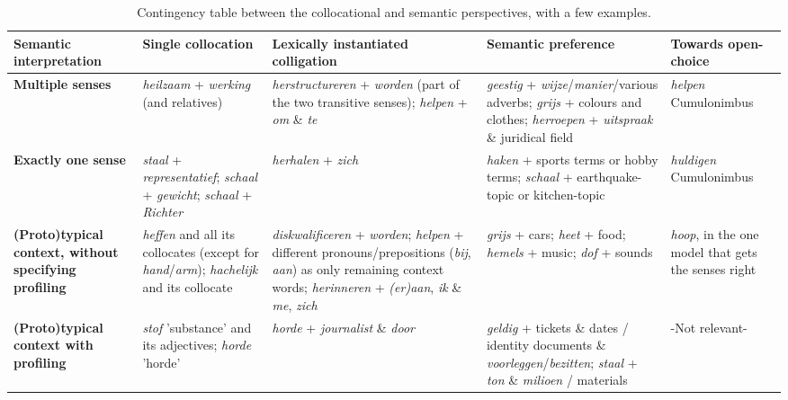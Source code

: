 \documentclass[
]{book}
\begin{document}
\begin{table}

\caption{\label{tab:colsem}Contingency table between the collocational and semantic perspectives, with a few examples.}
\centering
\begin{tabu} to 
\toprule
Semantic interpretation & Single collocation & Lexically instantiated colligation & Semantic preference & Towards open-choice\\
\midrule
\textbf{Multiple senses} & \textit{heilzaam} + \textit{werking} (and relatives) & \textit{herstructureren} + \textit{worden} (part of the two transitive senses); \textit{helpen} + \textit{om} \& \textit{te} & \textit{geestig} + \textit{wijze}/\textit{manier}/various adverbs; \textit{grijs} + colours and clothes; \textit{herroepen} + \textit{uitspraak} \& juridical field & \textit{helpen} Cumulonimbus\\
\addlinespace
\textbf{Exactly one sense} & \textit{staal} + \textit{representatief}; \textit{schaal} + \textit{gewicht}; \textit{schaal} + \textit{Richter} & \textit{herhalen} + \textit{zich} & \textit{haken} + sports terms or hobby terms; \textit{schaal} + earthquake-topic or kitchen-topic & \textit{huldigen} Cumulonimbus\\
\addlinespace
\textbf{(Proto)typical context, without specifying profiling} & \textit{heffen} and all its collocates (except for \textit{hand}/\textit{arm}); \textit{hachelijk} and its collocate & \textit{diskwalificeren} + \textit{worden}; \textit{helpen} + different pronouns/prepositions (\textit{bij}, \textit{aan}) as only remaining context words; \textit{herinneren} + \textit{(er)aan}, \textit{ik} \& \textit{me}, \textit{zich} & \textit{grijs} + cars; \textit{heet} + food; \textit{hemels} + music; \textit{dof} + sounds & \textit{hoop}, in the one model that gets the senses right\\
\addlinespace
\textbf{(Proto)typical context with profiling} & \textit{stof} 'substance' and its adjectives; \textit{horde} 'horde' & \textit{horde} + \textit{journalist} \& \textit{door} & \textit{geldig} + tickets \& dates / identity documents \& \textit{voorleggen}/\textit{bezitten}; \textit{staal} + \textit{ton} \& \textit{milioen} / materials & -Not relevant-\\
\bottomrule
\end{tabu}
\end{table}
\end{document}
